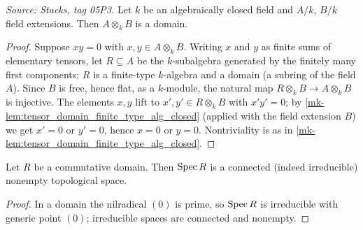 \begin{lemma}\label{mk-lem:tensor_domain_alg_closed}
  \leanok

  \textit{Source: Stacks, tag 05P3.}
  Let \(k\) be an algebraically closed field and \(A/k\), \(B/k\) field
  extensions. Then \(A \otimes_k B\) is a domain.
\end{lemma}
\begin{proof}
  \leanok
  Suppose \(x y = 0\) with \(x, y \in A \otimes_k B\). Writing \(x\) and
  \(y\) as finite sums of elementary tensors, let \(R \subseteq A\) be
  the \(k\)-subalgebra generated by the finitely many first components;
  \(R\) is a finite-type \(k\)-algebra and a domain (a subring of the
  field \(A\)). Since \(B\) is free, hence flat, as a \(k\)-module, the
  natural map \(R \otimes_k B \to A \otimes_k B\) is injective. The
  elements \(x, y\) lift to \(x', y' \in R \otimes_k B\) with
  \(x' y' = 0\); by \ref{mk-lem:tensor_domain_finite_type_alg_closed}
  (applied with the field extension \(B\)) we get \(x' = 0\) or
  \(y' = 0\), hence \(x = 0\) or \(y = 0\). Nontriviality is as in
  \ref{mk-lem:tensor_domain_finite_type_alg_closed}.
\end{proof}

\begin{lemma}\label{mk-lem:spec_domain_connected}
  \leanok

  Let \(R\) be a commutative domain. Then \(\operatorname{Spec} R\) is a connected
  (indeed irreducible) nonempty topological space.
\end{lemma}
\begin{proof}
  \leanok
  In a domain the nilradical \((0)\) is prime, so \(\operatorname{Spec} R\) is
  irreducible with generic point \((0)\); irreducible spaces are
  connected and nonempty.
\end{proof}

